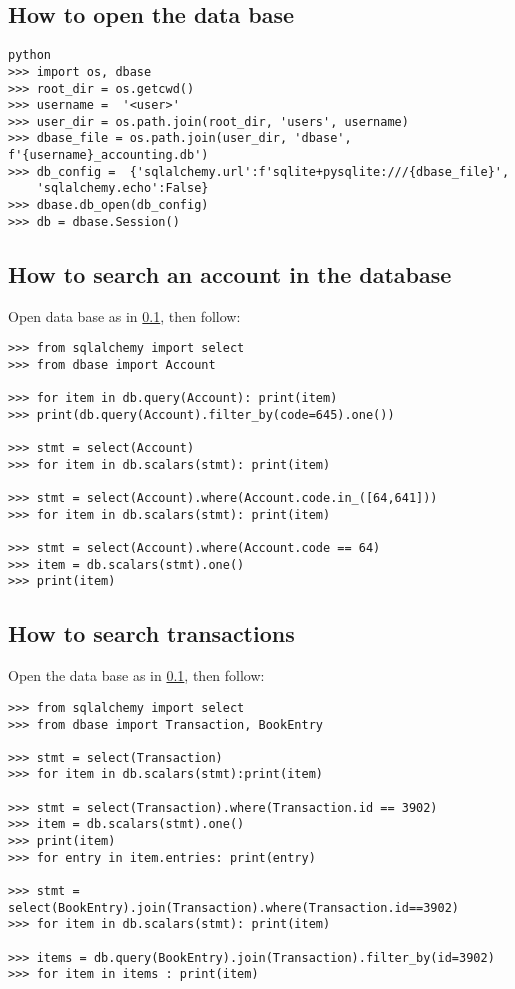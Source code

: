 \documentclass[12pt, a4paper]{article}
\begin{document}
\subsection{How to open the data base} \label{DB_open}
\begin{verbatim}
python
>>> import os, dbase
>>> root_dir = os.getcwd()
>>> username =  '<user>'
>>> user_dir = os.path.join(root_dir, 'users', username)
>>> dbase_file = os.path.join(user_dir, 'dbase', f'{username}_accounting.db')
>>> db_config =  {'sqlalchemy.url':f'sqlite+pysqlite:///{dbase_file}', 
	'sqlalchemy.echo':False}
>>> dbase.db_open(db_config)
>>> db = dbase.Session()
\end{verbatim}

\subsection{How to search an account  in the database} \label{DB_search_records}
Open data base as in \ref{DB_open}, then follow:
\begin{verbatim}
>>> from sqlalchemy import select
>>> from dbase import Account

>>> for item in db.query(Account): print(item)
>>> print(db.query(Account).filter_by(code=645).one())

>>> stmt = select(Account)
>>> for item in db.scalars(stmt): print(item)

>>> stmt = select(Account).where(Account.code.in_([64,641]))
>>> for item in db.scalars(stmt): print(item)

>>> stmt = select(Account).where(Account.code == 64)
>>> item = db.scalars(stmt).one()
>>> print(item)
\end{verbatim}

\subsection{How to search transactions}
Open the data base as in \ref{DB_open}, then follow:
\begin{verbatim}
>>> from sqlalchemy import select
>>> from dbase import Transaction, BookEntry

>>> stmt = select(Transaction)
>>> for item in db.scalars(stmt):print(item)

>>> stmt = select(Transaction).where(Transaction.id == 3902)
>>> item = db.scalars(stmt).one()
>>> print(item)
>>> for entry in item.entries: print(entry)

>>> stmt = select(BookEntry).join(Transaction).where(Transaction.id==3902)
>>> for item in db.scalars(stmt): print(item)

>>> items = db.query(BookEntry).join(Transaction).filter_by(id=3902)
>>> for item in items : print(item)

\end{verbatim}
\end{document}
